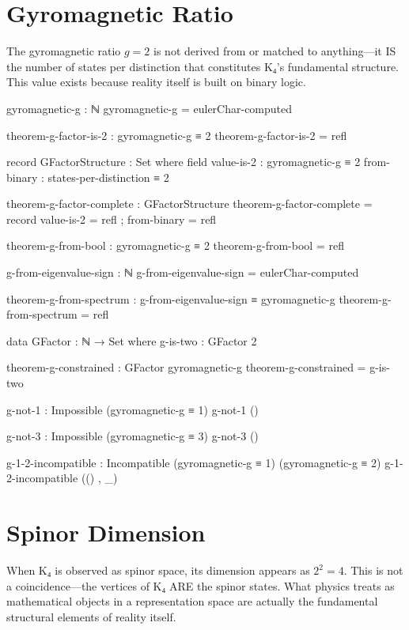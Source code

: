 \documentclass[11pt,a4paper]{book}
\begin{document}
\section{Gyromagnetic Ratio}

The gyromagnetic ratio $g=2$ is not derived from or matched to anything—it IS the number of states per distinction that constitutes K₄'s fundamental structure. This value exists because reality itself is built on binary logic.

\begin{code}
gyromagnetic-g : ℕ
gyromagnetic-g = eulerChar-computed

theorem-g-factor-is-2 : gyromagnetic-g ≡ 2
theorem-g-factor-is-2 = refl

record GFactorStructure : Set where
  field
    value-is-2 : gyromagnetic-g ≡ 2
    from-binary : states-per-distinction ≡ 2

theorem-g-factor-complete : GFactorStructure
theorem-g-factor-complete = record
  { value-is-2 = refl
  ; from-binary = refl
  }

theorem-g-from-bool : gyromagnetic-g ≡ 2
theorem-g-from-bool = refl
\end{code}

\begin{code}
g-from-eigenvalue-sign : ℕ
g-from-eigenvalue-sign = eulerChar-computed

theorem-g-from-spectrum : g-from-eigenvalue-sign ≡ gyromagnetic-g
theorem-g-from-spectrum = refl

data GFactor : ℕ → Set where
  g-is-two : GFactor 2

theorem-g-constrained : GFactor gyromagnetic-g
theorem-g-constrained = g-is-two

g-not-1 : Impossible (gyromagnetic-g ≡ 1)
g-not-1 ()

g-not-3 : Impossible (gyromagnetic-g ≡ 3)
g-not-3 ()

g-1-2-incompatible : Incompatible (gyromagnetic-g ≡ 1) (gyromagnetic-g ≡ 2)
g-1-2-incompatible (() , _)
\end{code}

\section{Spinor Dimension}

When K₄ is observed as spinor space, its dimension appears as $2^2 = 4$. This is not a coincidence—the vertices of K₄ ARE the spinor states. What physics treats as mathematical objects in a representation space are actually the fundamental structural elements of reality itself.
\end{document}
